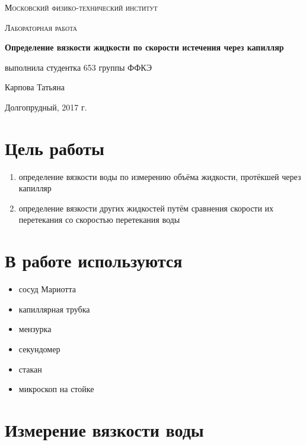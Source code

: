 \documentclass[a4paper]{article}
\begin{document}
\begin{titlepage}
	\centering
	\vspace{5cm}
	{\scshape\LARGE Московский физико-технический институт \par}
	\vspace{4cm}
	{\scshape\Large Лабораторная работа \par}
	\vspace{1cm}
	{\huge\bfseries Определение вязкости жидкости по скорости истечения через капилляр \par}
	\vspace{1cm}
	\vfill
\begin{flushright}
	{\large выполнила студентка 653 группы ФФКЭ}\par
	\vspace{0.3cm}
	{\LARGE Карпова Татьяна}
\end{flushright}
	

	\vfill

	Долгопрудный, 2017 г.
\end{titlepage}

\section{Цель работы}

\begin{enumerate}
    \item определение вязкости воды по измерению объёма жидкости, протёкшей через капилляр
    \item определение вязкости других жидкостей путём сравнения скорости их перетекания со скоростью перетекания воды
\end{enumerate}

\section{В работе используются}
\begin{itemize}
    \item сосуд Мариотта
    \item капиллярная трубка
    \item мензурка
    \item секундомер
    \item стакан
    \item микроскоп на стойке
\end{itemize}

\section{Измерение вязкости воды}
\end{document}
